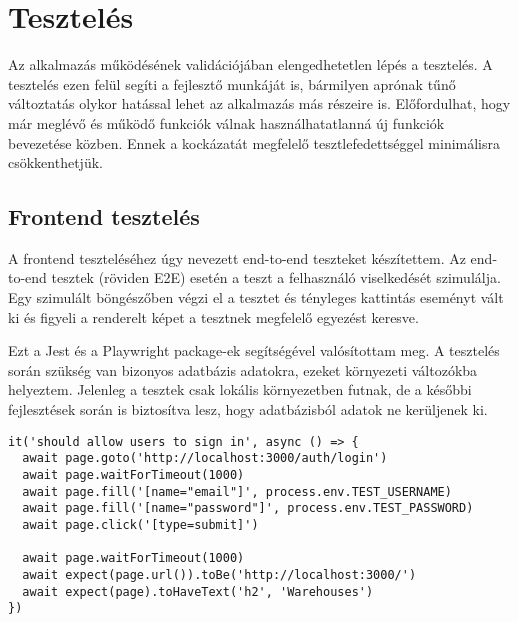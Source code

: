 \chapter{Tesztelés}

Az alkalmazás működésének validációjában elengedhetetlen lépés a tesztelés.
A tesztelés ezen felül segíti a fejlesztő munkáját is, bármilyen aprónak tűnő változtatás olykor hatással lehet az alkalmazás más részeire is.
Előfordulhat, hogy már meglévő és működő funkciók válnak használhatatlanná új funkciók bevezetése közben.
Ennek a kockázatát megfelelő tesztlefedettséggel minimálisra csökkenthetjük.

\section{Frontend tesztelés}

A frontend teszteléséhez úgy nevezett end-to-end teszteket készítettem.
Az end-to-end tesztek (röviden E2E) esetén a teszt a felhasználó viselkedését szimulálja.
Egy szimulált böngészőben végzi el a tesztet és tényleges kattintás eseményt vált ki és figyeli a renderelt képet a tesztnek megfelelő egyezést keresve.

Ezt a Jest és a Playwright package-ek segítségével valósítottam meg.
A tesztelés során szükség van bizonyos adatbázis adatokra, ezeket környezeti változókba helyeztem.
Jelenleg a tesztek csak lokális környezetben futnak, de a későbbi fejlesztések során is biztosítva lesz, hogy adatbázisból adatok ne kerüljenek ki.


\begin{lstlisting}[style=ES6, caption={Bejelentkezés E2E teszt}]
it('should allow users to sign in', async () => {
  await page.goto('http://localhost:3000/auth/login')
  await page.waitForTimeout(1000)
  await page.fill('[name="email"]', process.env.TEST_USERNAME)
  await page.fill('[name="password"]', process.env.TEST_PASSWORD)
  await page.click('[type=submit]')

  await page.waitForTimeout(1000)
  await expect(page.url()).toBe('http://localhost:3000/')
  await expect(page).toHaveText('h2', 'Warehouses')
})
\end{lstlisting}


